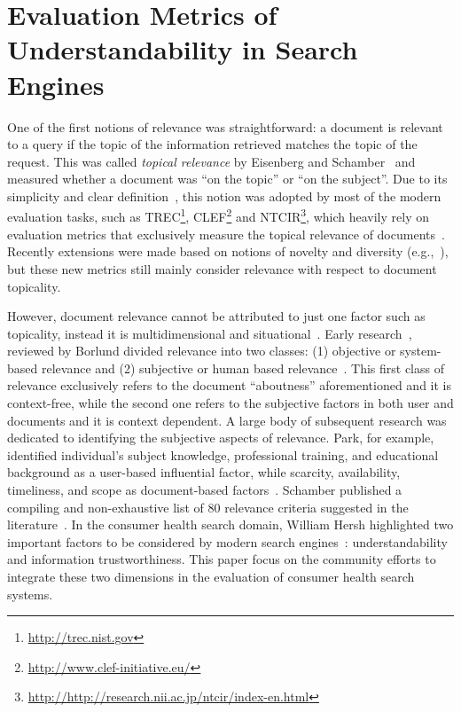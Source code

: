 
\section{Evaluation Metrics of Understandability in Search Engines}
\label{chp:evaluation_metrics}

One of the first notions of relevance was straightforward: a document is relevant to a query if the topic of the information retrieved matches the topic of the request.
This was called \textit{topical relevance} by Eisenberg and Schamber~\cite{eisenberg88} and measured whether a document was ``on the topic'' or ``on the subject''.
Due to its simplicity and clear definition~\cite{borlund03}, this notion was adopted by most of the modern evaluation tasks, such as TREC\footnote{\url{http://trec.nist.gov}}, CLEF\footnote{\url{http://www.clef-initiative.eu/}} and NTCIR\footnote{\url{http://http://research.nii.ac.jp/ntcir/index-en.html}}, which heavily rely on evaluation metrics that exclusively measure the topical relevance of documents~\cite{voorhees05}.
Recently extensions were made based on notions of novelty and diversity (e.g.,~\cite{clarke09}), but these new metrics still mainly consider relevance with respect to document topicality.

However, document relevance cannot be attributed to just one factor such as topicality, instead it is multidimensional and situational~\cite{borlund03}.
Early research~\cite{saracevic75,swanson86,harter92}, reviewed by Borlund divided relevance into two classes: (1) objective or system-based relevance and (2) subjective or human based relevance~\cite{borlund03}. 
This first class of relevance exclusively refers to the document ``aboutness'' aforementioned and it is context-free, while the second one refers to the subjective factors in both user and documents and it is context dependent.
A large body of subsequent research was dedicated to identifying the subjective aspects of relevance.
Park, for example, identified individual's subject knowledge, professional training, and educational background as a user-based influential factor, while scarcity, availability, timeliness, and scope as document-based factors~\cite{park93}.
Schamber published a compiling and non-exhaustive list of 80 relevance criteria suggested in the literature~\cite{schamber94}.
%
In the consumer health search domain, William Hersh highlighted two important factors to be considered by modern search engines~\cite{hersh08}: understandability and information trustworthiness. 
This paper focus on the community efforts to integrate these two dimensions in the evaluation of consumer health search systems.


